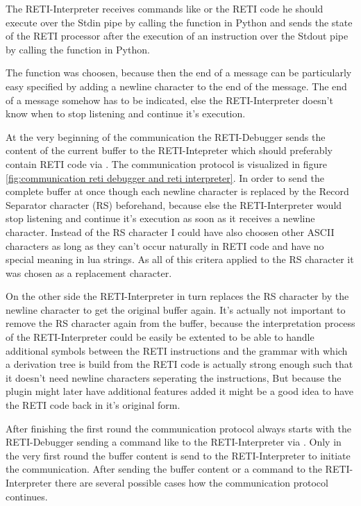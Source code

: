\documentclass{report}
\begin{document}
The RETI-Interpreter receives commands like  or the RETI code he should execute over the Stdin pipe by calling the  function in Python and sends the state of the RETI processor after the execution of an instruction over the Stdout pipe by calling the  function in Python.

The  function was choosen, because then the end of a message can be particularly easy specified by adding a newline character  to the end of the message. The end of a message somehow has to be indicated, else the RETI-Interpreter doesn't know when to stop listening and continue it's execution.

At the very beginning of the communication the RETI-Debugger sends the content of the current buffer to the RETI-Intepreter which should preferably contain RETI code via  . The \alert{communication protocol} is visualized in figure \ref{fig:communication reti debugger and reti interpreter}. In order to send the complete buffer at once though each newline character  is replaced by the Record Separator character (\alert{RS})  beforehand, because else the RETI-Interpreter would stop listening and continue it's execution as soon as it receives a newline character. Instead of the RS character I could have also choosen other ASCII characters as long as they can't occur naturally in RETI code and have no special meaning in lua strings. As all of this critera applied to the RS character it was chosen as a replacement character.

On the other side the RETI-Interpreter in turn replaces the RS character  by the newline character  to get the original buffer again. It's actually not important to remove the RS character again from the buffer, because the interpretation process of the RETI-Interpreter could be easily be extented to be able to handle additional symbols between the RETI instructions and the grammar with which a derivation tree is build from the RETI code is actually strong enough such that it doesn't need newline characters  seperating the instructions, But because the plugin might later have additional features added it might be a good idea to have the RETI code back in it's original form.

After finishing the first round the communication protocol always starts with the RETI-Debugger sending a command like  to the RETI-Interpreter via . Only in the very first round the buffer content is send to the RETI-Interpreter to initiate the communication. After sending the buffer content or a command to the RETI-Interpreter there are several possible cases how the communication protocol continues.
\end{document}
